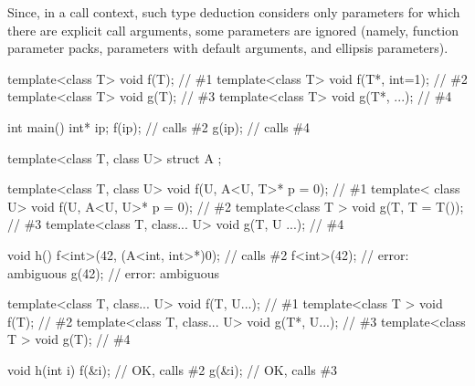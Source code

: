 \pnum
\begin{note}
Since, in a call context, such type deduction considers only parameters
for which there are explicit call arguments, some parameters are ignored (namely,
function parameter packs, parameters with default arguments, and ellipsis
parameters).
\begin{example}
\begin{codeblock}
template<class T> void f(T);                            // \#1
template<class T> void f(T*, int=1);                    // \#2
template<class T> void g(T);                            // \#3
template<class T> void g(T*, ...);                      // \#4

\end{codeblock}
\begin{codeblock}
int main() {
  int* ip;
  f(ip);                                                // calls \#2
  g(ip);                                                // calls \#4
}
\end{codeblock}
\end{example}
\begin{example}
\begin{codeblock}
template<class T, class U> struct A { };

template<class T, class U> void f(U, A<U, T>* p = 0);   // \#1
template<         class U> void f(U, A<U, U>* p = 0);   // \#2
template<class T         > void g(T, T = T());          // \#3
template<class T, class... U> void g(T, U ...);         // \#4

void h() {
  f<int>(42, (A<int, int>*)0);                          // calls \#2
  f<int>(42);                                           // error: ambiguous
  g(42);                                                // error: ambiguous
}
\end{codeblock}
\end{example}
\begin{example}
\begin{codeblock}
template<class T, class... U> void f(T, U...);          // \#1
template<class T            > void f(T);                // \#2
template<class T, class... U> void g(T*, U...);         // \#3
template<class T            > void g(T);                // \#4

void h(int i) {
  f(&i);                                                // OK, calls \#2
  g(&i);                                                // OK, calls \#3
}
\end{codeblock}
\end{example}
\end{note}

